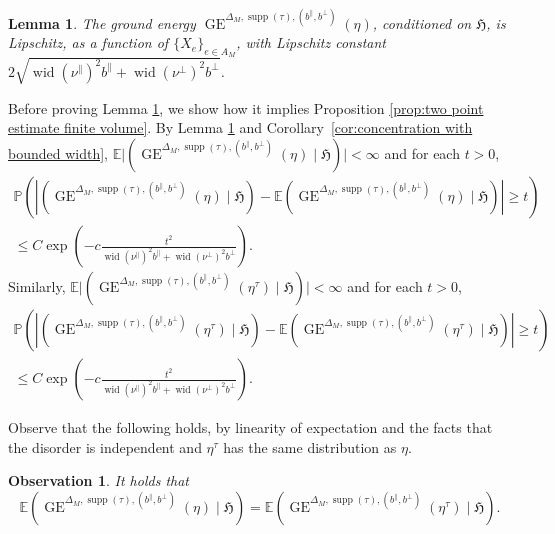 \documentclass[11pt, reqno]{amsart}
\newtheorem{lemma}[theorem]{Lemma}
\newtheorem{obs}[theorem]{Observation}
\newcommand{\E}{\mathbb{E}}
\DeclareMathOperator{\supp}{supp}
\DeclareMathOperator{\GE}{GE}
\renewcommand{\P}{\mathbb{P}}
\DeclareMathOperator{\wid}{wid}
\numberwithin{equation}{section}
\begin{document}
\begin{lemma}\label{lem:GE_Lip}
The ground energy $\GE^{\Delta_M,\supp(\tau),(b^{\parallel},b^{\perp})}(\eta)$, conditioned on $\mathfrak{H}$, 
is Lipschitz, as a function of $\{ X_e \}_{e\in A_{M}}$, with Lipschitz constant $2\sqrt{\wid (\nu^{\parallel})^{2}  b^{\parallel}+\wid (\nu^{\perp})^{2} b^{\perp}}$.
\end{lemma}

Before proving Lemma \ref{lem:GE_Lip}, we show how it implies Proposition \ref{prop:two point estimate finite volume}. 
By Lemma \ref{lem:GE_Lip} and Corollary~\ref{cor:concentration with bounded width}, 
$\E\lvert(\GE^{\Delta_M,\supp(\tau),(b^{\parallel},b^{\perp})}(\eta) \mid \mathfrak{H})\rvert<\infty$ and for each $t>0$,
\begin{multline}
\P\left(\left\lvert\left(\GE^{\Delta_M,\supp(\tau),(b^{\parallel},b^{\perp})}(\eta) \mid \mathfrak{H}\right)-\E \left(\GE^{\Delta_M,\supp(\tau),(b^{\parallel},b^{\perp})}(\eta) \mid \mathfrak{H}\right)\right\rvert \geq t \right)\\
\le C\exp\left(-c\frac{t^2}{\wid (\nu^{\parallel})^{2}  b^{\parallel}+\wid (\nu^{\perp})^{2} b^{\perp}}\right).
\label{eq:Talagrand1}\end{multline}
Similarly,
$\E\lvert(\GE^{\Delta_M,\supp(\tau),(b^{\parallel},b^{\perp})}(\eta^{\tau}) \mid \mathfrak{H})\rvert<\infty$ and for each $t>0$,
\begin{multline}
\P\left(\left\lvert\left(\GE^{\Delta_M,\supp(\tau),(b^{\parallel},b^{\perp})}(\eta^{\tau}) \mid \mathfrak{H}\right)-\E \left(\GE^{\Delta_M,\supp(\tau),(b^{\parallel},b^{\perp})}(\eta^{\tau}) \mid \mathfrak{H}\right)\right\rvert \geq t \right)\\
\le C\exp\left(-c\frac{t^2}{\wid (\nu^{\parallel})^{2}  b^{\parallel}+\wid (\nu^{\perp})^{2} b^{\perp}}\right).
\label{eq:Talagrand2}\end{multline}

Observe that the following holds, by linearity of expectation and the facts that the disorder is independent and $\eta^\tau$ has the same distribution as $\eta$.

\begin{obs}\label{obs:connditional expectation on ground energy is zero}
It holds that
$$
\E\left(\GE^{\Delta_M,\supp(\tau),(b^{\parallel},b^{\perp})}(\eta) \mid \mathfrak{H}\right)=\E\left(\GE^{\Delta_M,\supp(\tau),(b^{\parallel},b^{\perp})}(\eta^{\tau}) \mid \mathfrak{H}\right).
$$
\end{obs}
\end{document}
